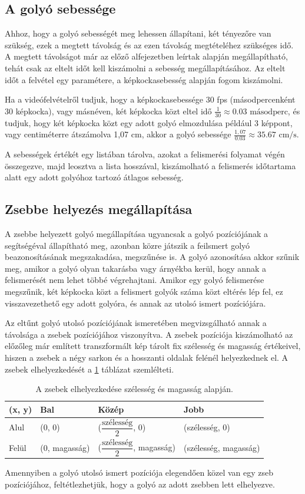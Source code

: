 \subsection{A golyó sebessége}
Ahhoz, hogy a golyó sebességét meg lehessen állapítani, két tényezőre van szükség, ezek a megtett távolság és az ezen távolság megtételéhez szükséges idő. A megtett távolságot már az előző alfejezetben leírtak alapján megállapítható, tehát csak az eltelt időt kell kiszámolni a sebesség megállapításához. Az eltelt időt a felvétel egy paramétere, a képkockasebesség alapján fogom kiszámolni.
\par Ha a videófelvételről tudjuk, hogy a képkockasebessége 30 fps (másodpercenként 30 képkocka), vagy másnéven, két képkocka közt eltel idő $\frac{1}{30} \approx 0.03\text{ másodperc}$, és tudjuk, hogy két képkocka közt egy adott golyó elmozdulása például 3 képpont, vagy centiméterre átszámolva 1,07 cm, akkor a golyó sebessége $\frac{1,07}{0.03} \approx 35.67 \text{ cm/s}$.
\par A sebességek értékét egy listában tárolva, azokat a felismerési folyamat végén összegezve, majd leosztva a lista hosszával, kiszámolható a felismerés időtartama alatt egy adott golyóhoz tartozó átlagos sebesség.

\subsection{Zsebbe helyezés megállapítása}
A zsebbe helyezett golyó megállapítása ugyancsak a golyó pozíciójának a segítségéval állapítható meg, azonban közre játszik a feilsmert golyó beazonosításának megszakadása, megszűnése is. A golyó azonosítása akkor szűnik meg, amikor a golyó olyan takarásba vagy árnyékba kerül, hogy annak a felismerését nem lehet többé végrehajtani. Amikor egy golyó felismerése megszűnik, két képkocka közt a felismert golyók száma közt eltérés lép fel, ez visszavezethető egy adott golyóra, és annak az utolsó ismert pozíciójára.
\par Az eltűnt golyó utolsó pozíciójának ismeretében megvizsgálható annak a távolsága a zsebek pozíciójához viszonyítva. A zsebek pozíciója kiszámolható az előzőleg már említett transzformált kép tárolt fix szélesség és magasság értékeivel, hiszen a zsebek a négy sarkon és a hosszanti oldalak felénél helyezkednek el. A zsebek elhelyezkedését a \ref{tab:zsebek_kiszamolasa} táblázat szemlélteti.

\begin{table}[!ht]
    \caption{A zsebek elhelyezkedése szélesség és magasság alapján.}
    \label{tab:zsebek_kiszamolasa}
	\footnotesize
	\centering
	\begin{tabular}{ l l l l }
		\toprule
		(x, y)  & Bal           & Közép                                    & Jobb \\
		\midrule
		Alul    & (0, 0)        & ($\dfrac{\text{szélesség}}{2}$, 0)        & (szélesség, 0)\\
		Felül   & (0, magasság) & ($\dfrac{\text{szélesség}}{2}$, magasság) & (szélesség, magasság)\\
		\bottomrule
	\end{tabular}
\end{table}

\par Amennyiben a golyó utolsó ismert pozíciója elegendően közel van egy zseb pozíciójához, feltétlezhetjük, hogy a golyó az adott zsebben lett elhelyezve.